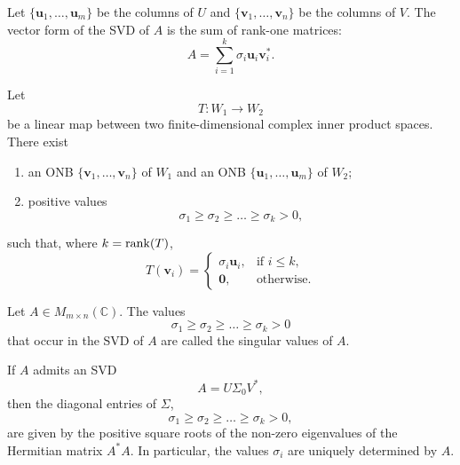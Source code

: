 \begin{remark}
Let $\{\mathbf{u}_1,\dots,\mathbf{u}_m\}$
be the columns of $U$ and
$\{\mathbf{v}_1,\dots,\mathbf{v}_n\}$
be the columns of $V$. 
The vector form of the SVD of $A$ is the sum of rank-one matrices:
\[
A=\sum_{i=1}^k \sigma_i\mathbf{u}_i\mathbf{v}_i^*.
\]
\end{remark}



\begin{theorem}
Let
\[
T:W_1\rightarrow W_2
\]
be a linear map between two finite-dimensional complex inner product spaces.
There exist
\begin{enumerate}
    \item an ONB $\{\mathbf{v}_1,\dots,\mathbf{v}_n\}$ of $W_1$ and an ONB
    $\{\mathbf{u}_1,\dots,\mathbf{u}_m\}$ of $W_2$;
    \item positive values
    \[
    \sigma_1\ge \sigma_2\ge \dots\ge \sigma_k>0,
    \]
\end{enumerate}
such that, where $k=\operatorname{rank}(T)$,
\[
T(\mathbf{v}_i)
=
\begin{cases}
\sigma_i \mathbf{u}_i, & \text{if } i\le k,\\
\mathbf{0}, & \text{otherwise.}
\end{cases}
\]
\end{theorem}


\begin{definition}
Let $A\in M_{m\times n}(\mathbb{C})$.
The values
\[
\sigma_1\ge \sigma_2\ge \dots\ge \sigma_k>0
\]
that occur in the SVD of $A$ are called the singular values of $A$.
\end{definition}

\begin{theorem}
If $A$ admits an SVD
\[
A=U\Sigma_0V^*,
\]
then the diagonal entries of $\Sigma$,
\[
\sigma_1\ge \sigma_2\ge \dots\ge \sigma_k>0,
\]
are given by the positive square roots of the non-zero eigenvalues of the Hermitian
matrix $A^*A$.
In particular, the values $\sigma_i$ are uniquely determined by $A$.
\end{theorem}

